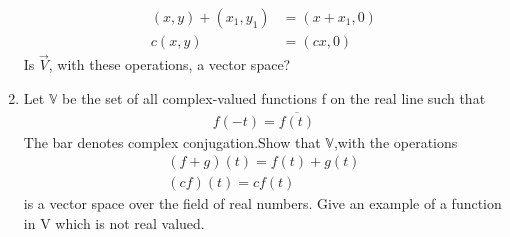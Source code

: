 \begin{enumerate}[label=\thesubsection.\arabic*.,ref=\thesubsection.\theenumi]
\begin{align}
    (x,y)+(x_1,y_1) &= (x+x_1,0) \label{eq:solutions/2/1/7/eq:eq1}\\
    c(x,y) &= (cx,0)
\end{align}
Is $\vec{V}$, with these operations, a vector space?
\\
\solution

%
\item    Let $\mathbb{V}$ be the set of all complex-valued functions f on the real line such that
   \begin{align}f(-t)=\overline{f(t)}\end{align}The bar denotes complex conjugation.Show that $\mathbb{V}$,with the operations\begin{align}(f+g)(t)=f(t)+g(t)\\(cf)(t)=cf(t)\end{align} is a vector space over the field of real numbers. Give an example of a function in V which is not real valued.
\\
\solution

%
\end{enumerate}


